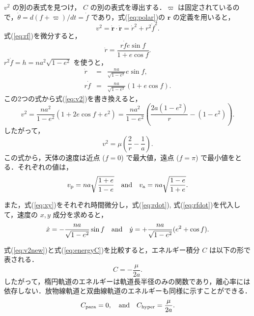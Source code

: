 \documentclass[11pt,a4paper,oneside,onecolumn]{jreport}
\begin{document}
$v^2$ の別の表式を見つけ， $C$ の別の表式を導出する．$\varpi$ は固定されているので，$\dot{\theta} = d (f + \varpi) / dt = \dot{f}$ であり，式(\ref{eq:polar})の ${\bm r}$ の定義を用いると，
\begin{equation}
v^2 = \dot{{\bm r}} \cdot \dot{{\bm r}} = \dot{r}^2 + r^2 \dot{f}^2. \label{eq:v2}
\end{equation}
式(\ref{eq:rf})を微分すると，
\begin{equation}
\dot{r} = \frac{r \dot{f} e \sin f}{1+ e \cos f}.
\end{equation}
$r^2 \dot{f} = h = n a^2 \sqrt{1 - e^2}$ を使うと，
\begin{eqnarray}
\dot{r} & = & \frac{n a}{\sqrt{1 - e^2}} e \sin f, \label{eq:rdot} \\
r \dot{f} & = & \frac{n a}{\sqrt{1 - e^2}} (1+ e \cos f). \label{eq:rfdot}
\end{eqnarray}
この2つの式から式(\ref{eq:v2})を書き換えると，
\begin{equation}
v^2 = \frac{n a^2}{1 - e^2} (1 + 2 e \cos f + e^2) = \frac{n a^2}{1 - e^2} \left( \frac{2 a (1 - e^2)}{r} - (1 - e^2) \right).
\end{equation}
したがって，
\begin{equation}
v^2 = \mu \left( \frac{2}{r} - \frac{1}{a} \right). \label{eq:v2new}
\end{equation}
この式から，天体の速度は近点 ($f = 0$) で最大値，遠点 ($f = \pi$) で最小値をとる．それぞれの値は，
\begin{equation}
v_{\rm p} = n a \sqrt{\frac{1 + e}{1 - e}} \quad {\rm and} \quad v_{\rm a} = n a \sqrt{\frac{1 - e}{1 + e}}.
\end{equation}

また，式(\ref{eq:xy})をそれぞれ時間微分し，式(\ref{eq:rdot}),  式(\ref{eq:rfdot})を代入して，速度の $x, y$ 成分を求めると，
\begin{equation}
\dot{x} = - \frac{n a}{\sqrt{1 - e^2}} \sin f \quad {\rm and} \quad  \dot{y} = + \frac{n a}{\sqrt{1 - e^2}} (e^2 + \cos f). \label{eq:xdotydot}
\end{equation}

式(\ref{eq:v2new})と式(\ref{eq:energyC})を比較すると，エネルギー積分 $C$ は以下の形で表される．
\begin{equation}
C = - \frac{\mu}{2 a}. \label{eq:C}
\end{equation}
したがって，楕円軌道のエネルギーは軌道長半径のみの関数であり，離心率には依存しない．放物線軌道と双曲線軌道のエネルギーも同様に示すことができる．
\begin{equation}
C_{{\rm para}} = 0, \quad {\rm and} \quad C_{{\rm hyper}} = \frac{\mu}{2 a}.
\end{equation}
\end{document}
